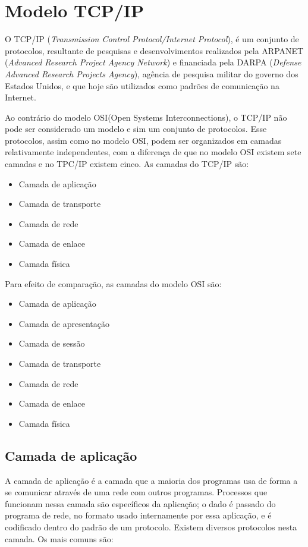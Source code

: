\section{Modelo TCP/IP}

O TCP/IP (\textit{Transmission Control Protocol/Internet Protocol}), é um 
conjunto de protocolos, resultante de pesquisas e desenvolvimentos realizados 
pela ARPANET (\textit{Advanced Research Project Agency Network}) e financiada 
pela DARPA (\textit{Defense Advanced Research Projects Agency}), agência de 
pesquisa militar do governo dos Estados Unidos, e que hoje são utilizados como 
padrões de comunicação na Internet.

Ao contrário do modelo OSI(Open Systems Interconnections), o TCP/IP não pode 
ser considerado um modelo e sim um conjunto de protocolos. Esse protocolos, 
assim como no modelo OSI, podem ser organizados em camadas relativamente 
independentes, com a diferença de que no modelo OSI existem sete camadas e no 
TPC/IP existem cinco. As camadas do TCP/IP são:

\begin{itemize}
	\item Camada de aplicação
	\item Camada de transporte
	\item Camada de rede
	\item Camada de enlace
	\item Camada física
\end{itemize}

Para efeito de comparação, as camadas do modelo OSI são:

\begin{itemize}
	\item Camada de aplicação
	\item Camada de apresentação
	\item Camada de sessão
	\item Camada de transporte
	\item Camada de rede
	\item Camada de enlace
	\item Camada física
\end{itemize}

\subsection{Camada de aplicação}

A camada de aplicação é a camada que a maioria dos programas usa de 
forma a se comunicar através de uma rede com outros programas. Processos que 
funcionam nessa camada são específicos da aplicação; o dado é passado do 
programa de rede, no formato usado internamente por essa aplicação, e é 
codificado dentro do padrão de um protocolo. Existem diversos protocolos nesta 
camada. Os mais comuns são:

